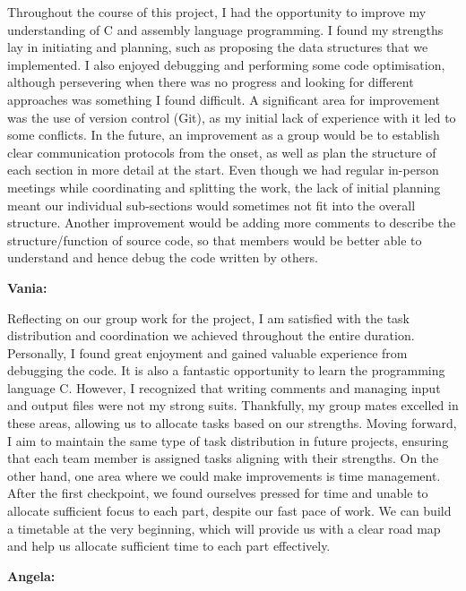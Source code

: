 \documentclass{article}
\begin{document}
Throughout the course of this project, I had the opportunity to improve my understanding of C and assembly language programming. I found my strengths lay in initiating and planning, such as proposing the data structures that we implemented. I also enjoyed debugging and performing some code optimisation, although persevering when there was no progress and looking for different approaches was something I found difficult. A significant area for improvement was the use of version control (Git), as my initial lack of experience with it led to some conflicts. In the future, an improvement as a group would be to establish clear communication protocols from the onset, as well as plan the structure of each section in more detail at the start. Even though we had regular in-person meetings while coordinating and splitting the work, the lack of initial planning meant our individual sub-sections would sometimes not fit into the overall structure. Another improvement would be adding more comments to describe the structure/function of source code, so that members would be better able to understand and hence debug the code written by others. 

\textbf{Vania:}

Reflecting on our group work for the project, I am satisfied with the task distribution and coordination we achieved throughout the entire duration. Personally, I found great enjoyment and gained valuable experience from debugging the code. It is also a fantastic opportunity to learn the programming language C. However, I recognized that writing comments and managing input and output files were not my strong suits. Thankfully, my group mates excelled in these areas, allowing us to allocate tasks based on our strengths. Moving forward, I aim to maintain the same type of task distribution in future projects, ensuring that each team member is assigned tasks aligning with their strengths. On the other hand, one area where we could make improvements is time management. After the first checkpoint, we found ourselves pressed for time and unable to allocate sufficient focus to each part, despite our fast pace of work. We can build a timetable at the very beginning, which will provide us with a clear road map and help us allocate sufficient time to each part effectively. 

\textbf{Angela:}
\end{document}
